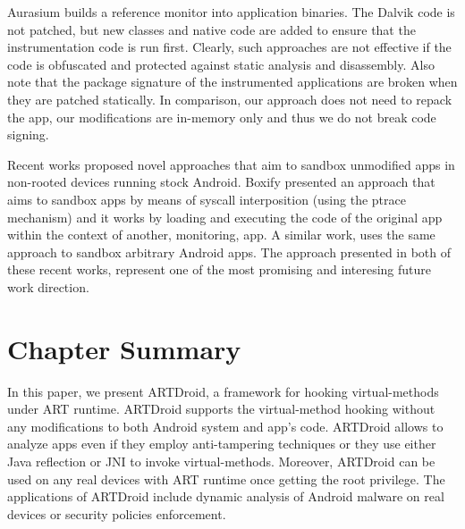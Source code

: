 Aurasium \cite{xu2012aurasium} builds a reference monitor into application binaries. The Dalvik code is not patched, but new classes and native code are added to ensure that the instrumentation code is run first. Clearly, such approaches are not effective if the code is obfuscated and protected against static analysis and disassembly. Also note that the package signature of the instrumented applications are broken when they are patched statically. In comparison, our approach does not need to repack the app, our modifications are in-memory only and thus we do not break code signing.

Recent works proposed novel approaches that aim to sandbox unmodified apps in non-rooted devices running stock Android. Boxify\cite{backes2015boxify} presented an approach that aims to sandbox apps by means of syscall interposition (using the ptrace mechanism) and it works by loading and executing the code of the original app within the context of another, monitoring, app. A similar work, \cite{bianchi2015njas} uses the same approach to sandbox arbitrary Android apps. The approach presented in both of these recent works, represent one of the most promising and interesing future work direction.

\section{Chapter Summary}
\label{sec:conclusion}
In this paper, we present ARTDroid, a framework for hooking virtual-methods under ART runtime. ARTDroid supports the virtual-method hooking without any modifications to both Android system and app's code. ARTDroid allows to analyze apps even if they employ anti-tampering techniques or they use either Java reflection or JNI to invoke virtual-methods. Moreover, ARTDroid can be used on any real devices with ART runtime once getting the root privilege. The applications of ARTDroid include dynamic analysis of Android malware on real devices or security policies enforcement.








